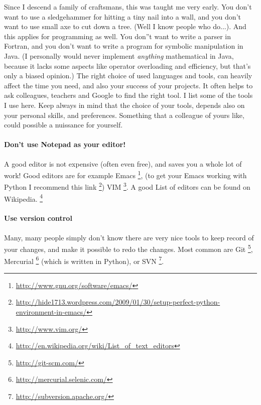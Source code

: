 \documentclass[letterpaper,10pt,english]{manual}
\begin{document}
Since I descend a family of craftsmans, this was taught me very early. You don't want to use
a sledgehammer for hitting a tiny nail into a wall, and you don't want to use small axe to cut down a tree.
(Well I know people who do...). And this applies for programming as well. You don''t want to write a parser in Fortran,
and you don't want to write a program for symbolic manipulation in Java. (I personally would never implement \emph{anything}
mathematical in Java, because it lacks some aspects like operator overloading and efficiency, but that's only a biased opinion.)
The right choice of used languages
and tools, can heavily affect the time you need, and also your success of your projects. It often helps to
ask colleagues, teachers and Google to find the right tool. I list
some of the tools I use here. Keep always in mind that the choice of
your tools, depends also on your personal skills, and
preferences. Something that a colleague of yours like, could possible
a nuissance for yourself.


\paragraph{Don't use Notepad as your editor!}

A good editor is not expensive (often even free), and saves you a
whole lot of work! Good editors are for example Emacs \footnote{
\href{http://www.gnu.org/software/emacs/}{http://www.gnu.org/software/emacs/}
},
(to get your Emacs working with Python I recommend this link \footnote{
\href{http://hide1713.wordpress.com/2009/01/30/setup-perfect-python-environment-in-emacs/}{http://hide1713.wordpress.com/2009/01/30/setup-perfect-python-environment-in-emacs/}
})  VIM \footnote{
\href{http://www.vim.org/}{http://www.vim.org/}
}.
A good List of editors can be found on Wikipedia. \footnote{
\href{http://en.wikipedia.org/wiki/List\_of\_text\_editors}{http://en.wikipedia.org/wiki/List\_of\_text\_editors}
}


\paragraph{Use version control}

Many, many people simply don't know there are very nice
tools to keep record of your changes, and make it possible
to redo the changes. Most common are Git \footnote{
\href{http://git-scm.com/}{http://git-scm.com/}
}, Mercurial \footnote{
\href{http://mercurial.selenic.com/}{http://mercurial.selenic.com/}
} (which is written in Python),
or SVN \footnote{
\href{http://subversion.apache.org/}{http://subversion.apache.org/}
}.
\end{document}
